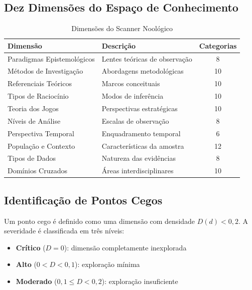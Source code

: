 \documentclass[12pt,a4paper]{article}
\begin{document}
\subsection{Dez Dimensões do Espaço de Conhecimento}

\begin{table}[H]
  \centering
  \caption{Dimensões do Scanner Noológico}
  \begin{tabular}{l l c}
    \toprule
    \textbf{Dimensão} & \textbf{Descrição} & \textbf{Categorias} \\
    \midrule
    Paradigmas Epistemológicos & Lentes teóricas de observação & 8 \\
    Métodos de Investigação    & Abordagens metodológicas    & 10 \\
    Referenciais Teóricos      & Marcos conceituais          & 10 \\
    Tipos de Raciocínio        & Modos de inferência         & 10 \\
    Teoria dos Jogos           & Perspectivas estratégicas   & 10 \\
    Níveis de Análise          & Escalas de observação       & 8 \\
    Perspectiva Temporal       & Enquadramento temporal      & 6 \\
    População e Contexto       & Características da amostra  & 12 \\
    Tipos de Dados             & Natureza das evidências     & 8 \\
    Domínios Cruzados          & Áreas interdisciplinares    & 10 \\
    \bottomrule
  \end{tabular}
\end{table}

\subsection{Identificação de Pontos Cegos}

Um ponto cego é definido como uma dimensão com densidade $D(d) < 0,2$. A severidade é classificada em três níveis:

\begin{itemize}[itemsep=1pt]
  \item \textbf{Crítico} ($D = 0$): dimensão completamente inexplorada
  \item \textbf{Alto} ($0 < D < 0,1$): exploração mínima
  \item \textbf{Moderado} ($0,1 \leq D < 0,2$): exploração insuficiente
\end{itemize}
\end{document}
